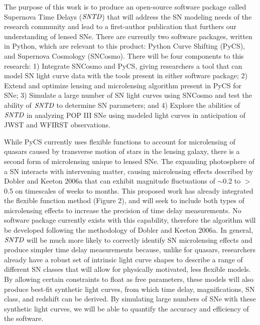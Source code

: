The purpose of this work is to produce an open-source software package called Supernova Time Delays ($\textit{SNTD}$) that will address the SN modeling needs of the research community and lead to a first-author publication that furthers our understanding of lensed SNe. There are currently two software packages, written in Python, which are relevant to this product: Python Curve Shifting (PyCS), and Supernova Cosmology (SNCosmo). There will be four components to this research: 1) Integrate SNCosmo and PyCS, giving researchers a tool that can model SN light curve data with the tools present in either software package; 2) Extend and optimize lensing and microlensing algorithm present in PyCS for SNe; 3) Simulate a large number of SN light curves using SNCosmo and test the ability of $\textit{SNTD}$ to determine SN parameters; and 4) Explore the abilities of $\textit{SNTD}$ in analyzing POP III SNe using modeled light curves in anticipation of JWST and WFIRST observations. 

While PyCS currently uses flexible functions to account for microlensing of quasars caused by transverse motion of stars in the lensing galaxy, there is a second form of microlensing unique to lensed SNe. The expanding photosphere of a SN interacts with intervening matter, causing microlensing effects described by Dobler and Keeton 2006a that can exhibit magnitude fluctuations of $\sim$0.2 to $>$0.5 on timescales of weeks to months. This proposed work has already integrated the flexible function method (Figure 2), and will seek to include both types of microlensing effects to increase the precision of time delay measurements. No software package currently exists with this capability, therefore the algorithm will be developed following the methodology of Dobler and Keeton 2006a. In general, $\textit{SNTD}$ will be much more likely to correctly identify SN microlensing effects and produce simpler time delay measurements because, unlike for quasars, researchers already have a robust set of intrinsic light curve shapes to describe a range of different SN classes that will allow for physically motivated, less flexible models. By allowing certain constraints to float as free parameters, these models will also produce best-fit synthetic light curves, from which time delay, magnifications, SN class, and redshift can be derived. By simulating large numbers of SNe with these synthetic light curves, we will be able to quantify the accuracy and efficiency of the software.


